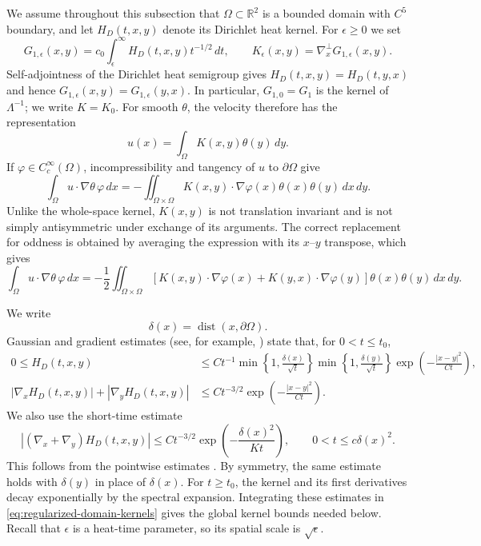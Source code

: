 \documentclass[11pt,reqno]{amsproc}
\newcommand{\R}{\mathbb R}
\newcommand{\Om}{\Omega}
\newcommand{\dist}{\operatorname{dist}}
\newcommand{\dd}{\,d}
\newcommand{\Lam}{\Lambda}
\begin{document}
We assume throughout this subsection that $\Om\subset\R^2$ is a bounded domain
with $C^5$ boundary, and let $H_D(t,x,y)$ denote its Dirichlet heat kernel.
For $\epsilon\ge0$ we set
\begin{equation}\label{eq:regularized-domain-kernels}
  G_{1,\epsilon}(x,y)
  =c_0\int_\epsilon^\infty
  H_D(t,x,y)t^{-1/2}\dd t,
  \qquad
  K_\epsilon(x,y)=\nabla_x^\perp G_{1,\epsilon}(x,y).
\end{equation}
Self-adjointness of the Dirichlet heat semigroup gives
$H_D(t,x,y)=H_D(t,y,x)$ and hence
$G_{1,\epsilon}(x,y)=G_{1,\epsilon}(y,x)$.  In particular,
$G_{1,0}=G_1$ is the kernel of $\Lam^{-1}$; we write $K=K_0$.
For smooth $\theta$, the velocity therefore has the representation
\[
  u(x)=\int_\Om K(x,y)\theta(y)\dd y.
\]
If $\varphi\in C_c^\infty(\Om)$, incompressibility and tangency of $u$ to
$\partial\Om$ give
\[
  \int_\Om u\cdot\nabla\theta\,\varphi\dd x
  =-
  \iint_{\Om\times\Om}K(x,y)\cdot\nabla\varphi(x)
  \theta(x)\theta(y)\dd x\dd y.
\]
Unlike the whole-space kernel, $K(x,y)$ is not translation invariant and is
not simply antisymmetric under exchange of its arguments.  The correct 
replacement for oddness is obtained by averaging the expression with its
$x$--$y$ transpose, which gives
\begin{equation}\label{eq:domain-symmetrized}
  \int_\Om u\cdot\nabla\theta\,\varphi\dd x
  =-\frac12
  \iint_{\Om\times\Om}
  \left[K(x,y)\cdot\nabla\varphi(x)+K(y,x)\cdot\nabla\varphi(y)\right]
  \theta(x)\theta(y)\dd x\dd y.
\end{equation}

We write
\[
  \delta(x)=\dist(x,\partial\Omega).
\]
Gaussian and gradient estimates (see, for example,
\cite{ConstantinIgnatova2017,ConstantinNguyen2018}) state that, for
$0<t\leq t_0$,
\begin{align}
  0\leq H_D(t,x,y)
  &\leq Ct^{-1}
  \min\left\{1,\frac{\delta(x)}{\sqrt t}\right\}
  \min\left\{1,\frac{\delta(y)}{\sqrt t}\right\}
  \exp\left(-\frac{|x-y|^2}{Ct}\right),
  \label{eq:dirichlet-heat-bound}\\
  |\nabla_xH_D(t,x,y)|+|\nabla_yH_D(t,x,y)|
  &\leq Ct^{-3/2}
  \exp\left(-\frac{|x-y|^2}{Ct}\right).
  \label{eq:dirichlet-heat-gradient-bound}
\end{align}
We also use the short-time estimate
\begin{equation}\label{eq:dirichlet-simultaneous-gradient}
 \left|(\nabla_x+\nabla_y)H_D(t,x,y)\right|
 \leq Ct^{-3/2}
 \exp\left(-\frac{\delta(x)^2}{Kt}\right),
 \qquad 0<t\leq c\delta(x)^2.
\end{equation}
This follows from the pointwise estimates
\cite[(24)--(27)]{ConstantinIgnatova2020}.  By symmetry, the
same estimate holds with $\delta(y)$ in place of $\delta(x)$.
For $t\geq t_0$, the kernel and its first derivatives decay exponentially
by the spectral expansion.  Integrating these estimates in
\eqref{eq:regularized-domain-kernels} gives the global kernel bounds needed
below.  Recall that $\epsilon$ is a heat-time parameter, so its spatial scale
is $\sqrt\epsilon$.
\end{document}
